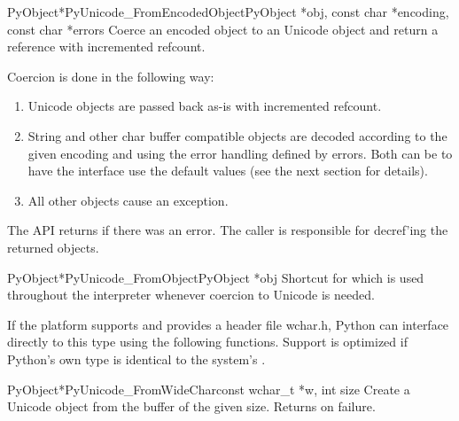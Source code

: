 \begin{cfuncdesc}{PyObject*}{PyUnicode_FromEncodedObject}{PyObject *obj,
                                                      const char *encoding,
                                                      const char *errors}
  Coerce an encoded object  to an Unicode object and return a
  reference with incremented refcount.

  Coercion is done in the following way:

\begin{enumerate}
\item  Unicode objects are passed back as-is with incremented
       refcount. 

\item String and other char buffer compatible objects are decoded
      according to the given encoding and using the error handling
      defined by errors.  Both can be \NULL{} to have the interface
      use the default values (see the next section for details).

\item All other objects cause an exception.
\end{enumerate}

  The API returns \NULL{} if there was an error.  The caller is
  responsible for decref'ing the returned objects.
\end{cfuncdesc}

\begin{cfuncdesc}{PyObject*}{PyUnicode_FromObject}{PyObject *obj}
  Shortcut for 
  which is used throughout the interpreter whenever coercion to
  Unicode is needed.
\end{cfuncdesc}


If the platform supports  and provides a header file
wchar.h, Python can interface directly to this type using the
following functions. Support is optimized if Python's own
 type is identical to the system's .

\begin{cfuncdesc}{PyObject*}{PyUnicode_FromWideChar}{const wchar_t *w,
                                                     int size}
  Create a Unicode object from the  buffer  of
  the given size.  Returns \NULL{} on failure.
\end{cfuncdesc}


